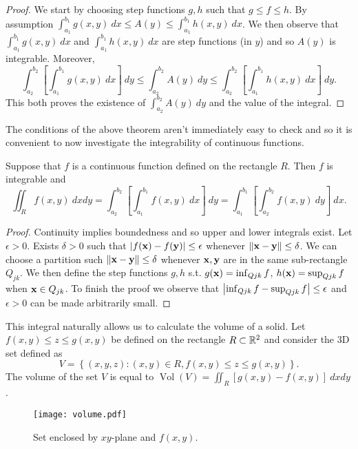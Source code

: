 \begin{proof}
    We start by choosing step functions \(g,h\) such that \(g\leq f \leq h\).
    By assumption \(\int_{a_1}^{b_1} g(x,y) \ dx \leq A(y) \leq \int_{a_1}^{b_1} h(x,y) \ dx\).
    We then observe that \(\int_{a_1}^{b_1} g(x,y) \ dx \) and \(\int_{a_1}^{b_1} h(x,y) \ dx\) are step functions (in \(y\)) and so \(A(y)\) is integrable.
    Moreover,
    \[
        \int_{a_2}^{b_2} \left[ \int_{a_1}^{b_1} g(x,y) \ dx  \right] \ dy
        \leq \int_{a_2}^{b_2} A(y) \ dy
        \leq \int_{a_2}^{b_2} \left[ \int_{a_1}^{b_1} h(x,y) \ dx  \right] \ dy.
    \]
    This both proves the existence of  \(\int_{a_2}^{b_2} A(y) \ dy\) and the value of the integral.
\end{proof}
%
The conditions of the above theorem aren't immediately easy to check and so it is convenient to now investigate the integrability of continuous functions.
%
\begin{theorem}
    Suppose that \(f\) is a continuous function defined on the rectangle \(R\).
    Then \(f\) is integrable and
    \[
        \iint_{R} f(x,y) \ dx dy
        = \int_{a_2}^{b_2} \left[ \int_{a_1}^{b_1} f(x,y) \ dx  \right] \ dy
        = \int_{a_1}^{b_1} \left[\int_{a_2}^{b_2}  f(x,y) \ dy  \right] \ dx.
    \]
\end{theorem}
%
\begin{proof}
    Continuity implies boundedness and so upper and lower integrals exist.
    Let \(\epsilon>0\). Exists \(\delta>0\) such that \(\left|f(\mathbf{x})-f(\mathbf{y})\right|\leq \epsilon\) whenever \(\left\|\mathbf{x}-\mathbf{y}\right\|\leq \delta\).
    We can choose a partition such  \(\left\|\mathbf{x}-\mathbf{y}\right\|\leq \delta\) whenever \(\mathbf{x},\mathbf{y}\) are in the same sub-rectangle \(Q_{jk}\).
    We then define the step functions \(g,h\) s.t. \(g(\mathbf{x})=\inf_{Q{jk}} f\),   \(h(\mathbf{x})=\sup_{Q{jk}} f\) when \(\mathbf{x}\in Q_{jk}\).
    To finish the proof we observe that \(\left|\inf_{Q{jk}} f - \sup_{Q{jk}} f \right|\leq \epsilon\) and \(\epsilon>0\) can be made arbitrarily small.
\end{proof}

This integral naturally allows us to calculate the volume of a solid.
Let \(f(x,y)\leq z \leq g(x,y)\) be defined on the rectangle \(R \subset \mathbb{R}^2\) and consider the 3D set defined as
\[
    V = \left\{(x,y,z): (x,y)\in R, f(x,y)\leq z \leq g(x,y) \right\}.
\]
The volume of the set \(V\) is equal to
\( \operatorname{Vol}(V) = \iint_{R} \left[ g(x,y) - f(x,y) \right] \ dx dy\).
%
\begin{figure}
    \centering
    \texttt{[image: volume.pdf]}
    \caption{Set enclosed by \(xy\)-plane and \(f(x,y)\).}
\end{figure}

